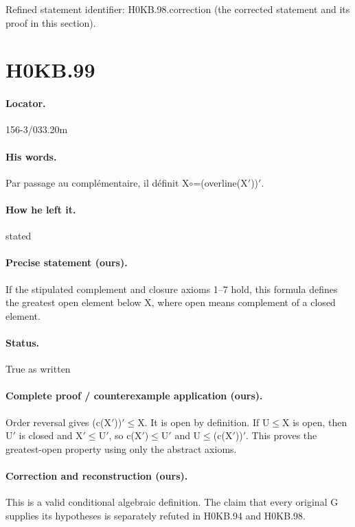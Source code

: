 \noindent Refined statement identifier: H0KB.98.correction (the corrected statement and its proof in this section).

\section*{H0KB.99}\label{statement:H0KB.99}
\paragraph{Locator.} 156-3/033.20m

\paragraph{His words.} Par passage au complémentaire, il définit X\ensuremath{\circ}=(overline(X\ensuremath{\prime}))\ensuremath{\prime}.

\paragraph{How he left it.} stated

\paragraph{Precise statement (ours).} If the stipulated complement and closure axioms 1–7 hold, this formula defines the greatest open element below X, where open means complement of a closed element.

\paragraph{Status.} True as written

\paragraph{Complete proof / counterexample application (ours).} Order reversal gives (c(X\ensuremath{\prime}))\ensuremath{\prime}\ensuremath{\leq}X. It is open by definition. If U\ensuremath{\leq}X is open, then U\ensuremath{\prime} is closed and X\ensuremath{\prime}\ensuremath{\leq}U\ensuremath{\prime}, so c(X\ensuremath{\prime})\ensuremath{\leq}U\ensuremath{\prime} and U\ensuremath{\leq}(c(X\ensuremath{\prime}))\ensuremath{\prime}. This proves the greatest-open property using only the abstract axioms.

\paragraph{Correction and reconstruction (ours).} This is a valid conditional algebraic definition. The claim that every original G supplies its hypotheses is separately refuted in H0KB.94 and H0KB.98.

